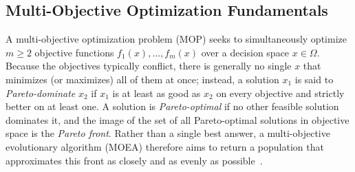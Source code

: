 \subsection{Multi-Objective Optimization Fundamentals}
\label{sec:background:moo}

A multi-objective optimization problem (MOP) seeks to simultaneously
optimize $m \geq 2$ objective functions
$f_1(x), \dots, f_m(x)$ over a decision space $x \in \Omega$. Because the
objectives typically conflict, there is generally no single $x$ that
minimizes (or maximizes) all of them at once; instead, a solution
$x_1$ is said to \emph{Pareto-dominate} $x_2$ if $x_1$ is at least as
good as $x_2$ on every objective and strictly better on at least one. A
solution is \emph{Pareto-optimal} if no other feasible solution
dominates it, and the image of the set of all Pareto-optimal solutions
in objective space is the \emph{Pareto front}. Rather than a single best
answer, a multi-objective evolutionary algorithm (MOEA) therefore aims to
return a population that approximates this front as closely and as
evenly as possible~\citep{emmerich2018tutorial}.

